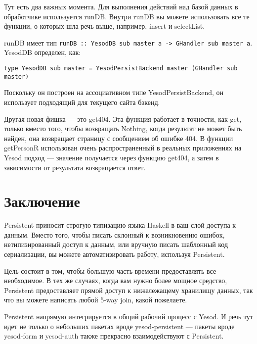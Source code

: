 Тут есть два важных момента. Для выполнения действий над базой данных в обработчике используется runDB. Внутри runDB вы можете использовать все те функции, о которых шла речь выше, например, insert и selectList. 

\begin{remark}
runDB имеет тип \lstinline'runDB :: YesodDB sub master a -> GHandler sub master a'. YesodDB определен, как:

\begin{lstlisting}
type YesodDB sub master = YesodPersistBackend master (GHandler sub master)
\end{lstlisting}

Поскольку он построен на ассоциативном типе YesodPersistBackend, он использует подходящий для текущего сайта бэкенд.
\end{remark}

Другая новая фишка --- это get404. Эта функция работает в точности, как get, только вместо того, чтобы возвращать Nothing, когда результат не может быть найден, она возвращает страницу с сообщением об ошибке 404. В функции getPersonR использован очень распространенный в реальных приложениях на Yesod подход --- значение получается через функцию get404, а затем в зависимости от результата возвращается ответ.

\section{Заключение} %

Persistent приносит строгую типизацию языка Haskell в ваш слой доступа к данным. Вместо того, чтобы писать склонный к возникновению ошибок, нетипизированный доступ к данным, или вручную писать шаблонный код сериализации, вы можете автоматизировать работу, используя Persistent.

Цель состоит в том, чтобы большую часть времени предоставлять все необходимое. В тех же случаях, когда вам нужно более мощное средство, Persistent предоставляет прямой доступ к нижележащему хранилищу данных, так что вы можете написать любой 5-way join, какой пожелаете.

Persistent напрямую интегрируется в общий рабочий процесс с Yesod. И речь тут идет не только о небольших пакетах вроде yesod-persistent --- пакеты вроде yesod-form и yesod-auth также прекрасно взаимодействуют с Persistent.  %
